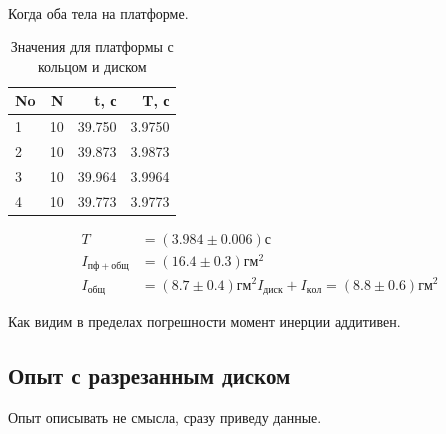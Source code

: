 \documentclass[a4paper, 12pt]{article}
\begin{document}
    \paragraph{}
    Когда оба тела на платформе.

    \begin{table}[h!]
    \begin{center}
    \begin{tabular}{|l|r|r|r|}
    \hline
    No &   N &       t, с &         T, с \\
    \hline
    1  &  10 &  39.750 &  3.9750 \\
    2  &  10 &  39.873 &  3.9873 \\
    3  &  10 &  39.964 &  3.9964 \\
    4  &  10 &  39.773 &  3.9773 \\
    \hline
    \end{tabular}
    \end{center}
    \caption{Значения для платформы с кольцом и диском}

    \end{table}

    \begin{align*}
    T &= (3.984 \pm 0.006)с \\
    I_{пф+общ}&=(16.4 \pm 0.3)гм^2 \\
    I_{общ}&=(8.7 \pm 0.4)гм^2
    I_{диск} + I_{кол}  = (8.8 \pm 0.6)гм^2
    \end{align*}

    Как видим в пределах погрешности момент инерции аддитивен.

    \subsection{Опыт с разрезанным диском}

    Опыт описывать не смысла, сразу приведу данные.
\end{document}
